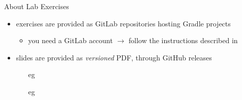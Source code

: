 \documentclass[presentation]{beamer}\mode<presentation>{\usetheme{AMSBolognaFC}}
\begin{document}
\begin{frame}[c,allowframebreaks]{About Lab Exercises}
\begin{itemize}
        \bigskip

        \item exercises are provided as GitLab repositories hosting Gradle projects
        \begin{itemize}
            \item you need a GitLab account $\rightarrow$ follow the instructions described in \cite{envSetup}
        \end{itemize}

        \bigskip

        \item slides are provided as \emph{versioned} PDF, through GitHub releases
        \begin{itemize}
            \item[eg] 
            \item[eg] 
        \end{itemize}

    \end{itemize}

\end{frame}
\end{document}

